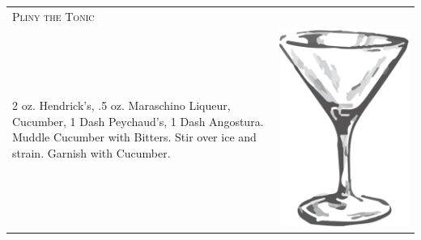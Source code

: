 \documentclass{article}
\begin{document}
\begin{multicols}{2}
\begin{tabular}{p{2in} p{0.5in}}
\multicolumn{2}{p{3in}}{\centering\Huge\textsc{Pliny the Tonic}} \\ 
   \vspace{-0.1in}2 oz. Hendrick's, .5 oz. Maraschino Liqueur, Cucumber, 1 Dash Peychaud's, 1 Dash Angostura. Muddle Cucumber with Bitters. Stir over ice and strain. Garnish with Cucumber. &
   \vspace{-0.1in} \includegraphics{goblet.png}
\end{tabular}


\end{multicols}
\end{document}
